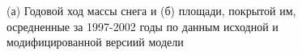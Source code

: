 \documentclass[a4paper, fontsize=14pt]{scrartcl}
\begin{document}
\begin{figure}[h]
    \begin{minipage}[h]{0.48\linewidth}
    \end{minipage}
    \hfill
    \begin{minipage}[h]{0.51\linewidth}
    \end{minipage}
    \caption{(а) Годовой ход массы снега и (б) площади, покрытой им, осредненные за 1997-2002 годы по данным исходной и модифицированной версиий модели}
    \label{fig:imageSn}
\end{figure}
\end{document}
